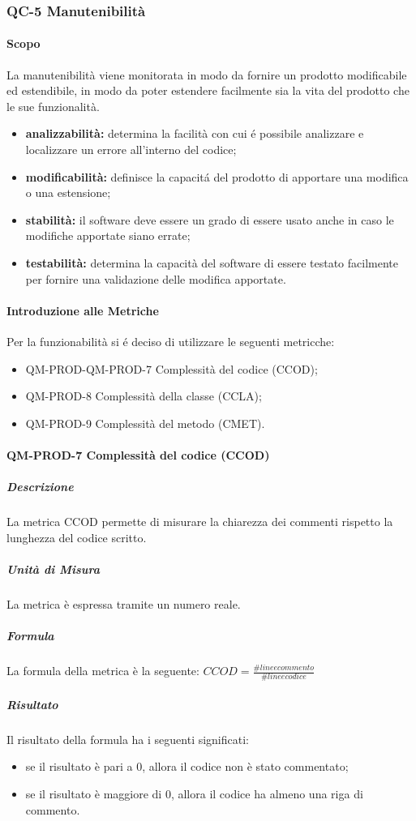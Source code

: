 		\subsubsection{QC-5 Manutenibilità}
			\paragraph{Scopo}
				La manutenibilità viene monitorata in modo da fornire un prodotto modificabile ed estendibile, in modo da poter estendere facilmente sia la vita del prodotto che le sue funzionalità.
				\begin{itemize}
					\item \textbf{analizzabilità:} determina la facilità con cui é possibile analizzare e localizzare un errore all'interno del codice;
					\item \textbf{modificabilità:} definisce la capacitá del prodotto di apportare una modifica o una estensione;
					\item \textbf{stabilità:} il software deve essere un grado di essere usato anche in caso le modifiche apportate siano errate;
					\item \textbf{testabilità:} determina la capacità del software di essere testato facilmente per fornire una validazione delle modifica apportate.
				\end{itemize}
			\paragraph{Introduzione alle Metriche}
				Per la funzionabilità si é deciso di utilizzare le seguenti metricche:
				\begin{itemize}
					\item QM-PROD-QM-PROD-7 Complessità del codice (CCOD);
					\item QM-PROD-8 Complessità della classe (CCLA);
					\item QM-PROD-9 Complessità del metodo (CMET).
				\end{itemize}
			\paragraph{QM-PROD-7 Complessità del codice (CCOD)}
				\subparagraph{Descrizione}
					La metrica CCOD permette di misurare la chiarezza dei commenti rispetto la lunghezza del codice scritto.
				\subparagraph{Unità di Misura}
					La metrica è espressa tramite un numero reale.
				\subparagraph{Formula}
					La formula della metrica è la seguente:
				 \(
				 		CCOD = \frac{\# linee commento}{\# linee codice}
				 \)
				\subparagraph{Risultato}
					Il risultato della formula ha i seguenti significati:
					\begin{itemize}
						\item se il risultato è pari a 0, allora il codice non è stato commentato;
						\item se il risultato è maggiore di 0, allora il codice ha almeno una riga di commento.
					\end{itemize}
